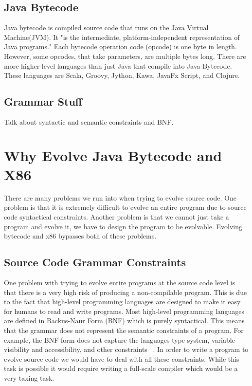 \documentclass{sig-alternate}
\begin{document}
\subsection{Java Bytecode}
Java bytecode is compiled source code that runs on the Java Virtual Machine(JVM). It "is the intermediate, platform-independent representation of Java programs\cite{VIII:2011}." Each bytecode operation code (opcode) is one byte in length. However, some opcodes, that take parameters, are multiple bytes long\cite{JavaBytecode:2014}.
There are more higher-level languages than just Java that compile into Java Bytecode. These languages are Scala, Groovy, Jython, Kawa, JavaFx Script, and Clojure\cite{FINCH:2011}.


\subsection{Grammar Stuff}
Talk about syntactic and semantic constraints and BNF.


\section{Why Evolve Java Bytecode and X86}

There are many problems we run into when trying to evolve source code. One problem is that it is extremely difficult to evolve an entire program due to source code syntactical constraints. Another problem is that we cannot just take a program and evolve it, we have to design the program to be evolvable. Evolving bytecode and x86 bypasses both of these problems.


\subsection{Source Code Grammar Constraints}
One problem with trying to evolve entire programs at the source code level is that there is a very high risk of producing a non-compilable program. This is due to the fact that high-level programming languages are designed to make it easy for humans to read and write programs. Most high-level programming languages are defined in Backus-Naur Form (BNF) which is purely syntactical\cite{BNF:2014}\cite{FINCH:2011}. This means that the grammar does not represent the semantic constraints of a program. For example, the BNF form does not capture the languages type system, variable visibility and accessibility, and other constraints ~\cite{FINCH:2011}. In order to write a program to evolve source code we would have to deal with all these constraints. While this task is possible it would require writing a full-scale compiler which would be a very taxing task. \par
\end{document}
